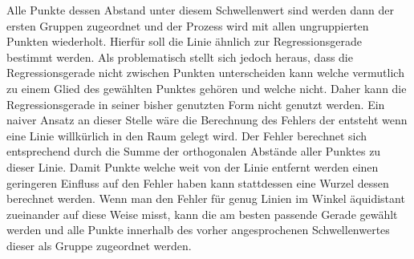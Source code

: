 Alle Punkte dessen Abstand unter diesem Schwellenwert sind werden dann der ersten Gruppen zugeordnet und der Prozess wird mit allen ungruppierten Punkten wiederholt.
Hierfür soll die Linie ähnlich zur Regressionsgerade bestimmt werden.
Als problematisch stellt sich jedoch heraus, dass die Regressionsgerade nicht zwischen Punkten unterscheiden kann welche vermutlich zu einem Glied des gewählten Punktes gehören und welche nicht.
Daher kann die Regressionsgerade in seiner bisher genutzten Form nicht genutzt werden.
Ein naiver Ansatz an dieser Stelle wäre die Berechnung des Fehlers der entsteht wenn eine Linie willkürlich in den Raum gelegt wird.
Der Fehler berechnet sich entsprechend durch die Summe der orthogonalen Abstände aller Punktes zu dieser Linie.
Damit Punkte welche weit von der Linie entfernt werden einen geringeren Einfluss auf den Fehler haben kann stattdessen eine Wurzel dessen berechnet werden.
Wenn man den Fehler für genug Linien im Winkel äquidistant zueinander auf diese Weise misst, kann die am besten passende Gerade gewählt werden und alle Punkte innerhalb des vorher angesprochenen Schwellenwertes dieser als Gruppe zugeordnet werden.

